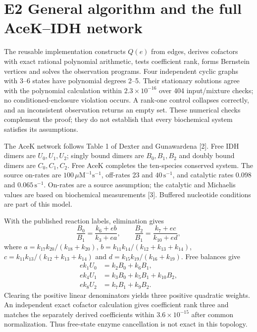 \documentclass[11pt]{article}
\begin{document}
\section*{E2 General algorithm and the full AceK--IDH network}
The reusable implementation constructs $Q(e)$ from edges, derives cofactors with exact rational polynomial arithmetic, tests coefficient rank, forms Bernstein vertices and solves the observation programs. Four independent cyclic graphs with 3--6 states have polynomial degrees 2--5. Their stationary solutions agree with the polynomial calculation within $2.3\times10^{-16}$ over 404 input/mixture checks; no conditioned-enclosure violation occurs. A rank-one control collapses correctly, and an inconsistent observation returns an empty set. These numerical checks complement the proof; they do not establish that every biochemical system satisfies its assumptions.

The AceK network follows Table 1 of Dexter and Gunawardena [2]. Free IDH dimers are $U_0,U_1,U_2$; singly bound dimers are $B_0,B_1,B_2$ and doubly bound dimers are $C_0,C_1,C_2$. Free AceK completes the ten-species conserved system. The source on-rates are $100\,\mu\mathrm{M}^{-1}\mathrm{s}^{-1}$, off-rates 23 and $40\,\mathrm{s}^{-1}$, and catalytic rates 0.098 and $0.065\,\mathrm{s}^{-1}$. On-rates are a source assumption; the catalytic and Michaelis values are based on biochemical measurements [3]. Buffered nucleotide conditions are part of this model.

With the published reaction labels, elimination gives
\begin{equation}
 \frac{B_0}{B_1}=\frac{k_6+eb}{k_3+ea},\qquad
 \frac{B_2}{B_1}=\frac{k_7+ec}{k_{10}+ed},
\end{equation}
where $a=k_{17}k_{20}/(k_{18}+k_{20})$, $b=k_{11}k_{14}/(k_{12}+k_{13}+k_{14})$, $c=k_{11}k_{13}/(k_{12}+k_{13}+k_{14})$ and $d=k_{15}k_{19}/(k_{16}+k_{19})$. Free balances give
\begin{align}
 ek_1U_0&=k_2B_0+k_6B_1,\\
 ek_4U_1&=k_3B_0+k_5B_1+k_{10}B_2,\\
 ek_8U_2&=k_7B_1+k_9B_2.
\end{align}
Clearing the positive linear denominators yields three positive quadratic weights. An independent exact cofactor calculation gives coefficient rank three and matches the separately derived coefficients within $3.6\times10^{-15}$ after common normalization. Thus free-state enzyme cancellation is not exact in this topology.
\end{document}
